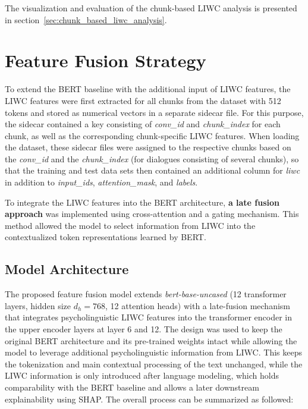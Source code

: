 The visualization and evaluation of the chunk-based LIWC analysis is presented in section~\ref{sec:chunk_based_liwc_analysis}.

\section{Feature Fusion Strategy}


To extend the BERT baseline with the additional input of LIWC features, the LIWC features were first extracted for all chunks from the dataset with 512 tokens and stored as numerical vectors in a separate sidecar file.  For this purpose, the sidecar contained a key consisting of \textit{conv\_id} and \textit{chunk\_index} for each chunk, as well as the corresponding chunk-specific LIWC features. 
When loading the dataset, these sidecar files were assigned to the respective chunks based on the \textit{conv\_id} and the \textit{chunk\_index} (for dialogues consisting of several chunks), so that the training and test data sets then contained an additional column for \textit{liwc} in addition to \textit{input\_ids}, \textit{attention\_mask}, and \textit{labels}. \newline

To integrate the LIWC features into the BERT architecture, \textbf{a late fusion approach} was implemented using cross-attention and a gating mechanism. This method allowed the model to select information from LIWC into the contextualized token representations learned by BERT. 

\subsection{Model Architecture}

The proposed feature fusion model extends \textit{bert-base-uncased} (12 transformer layers, hidden size \(d_h=768\), 12 attention heads) with a late-fusion mechanism that integrates psycholinguistic LIWC features into the transformer encoder in the upper encoder layers at layer 6 and 12. The design was used to keep the original BERT architecture and its pre-trained weights intact while allowing the model to leverage additional psycholinguistic information from LIWC. This keeps the tokenization and main contextual processing of the text unchanged, while the LIWC information is only introduced after language modeling, which holds comparability with the BERT baseline and allows a later downstream explainability using SHAP. The overall process can be summarized as followed:


